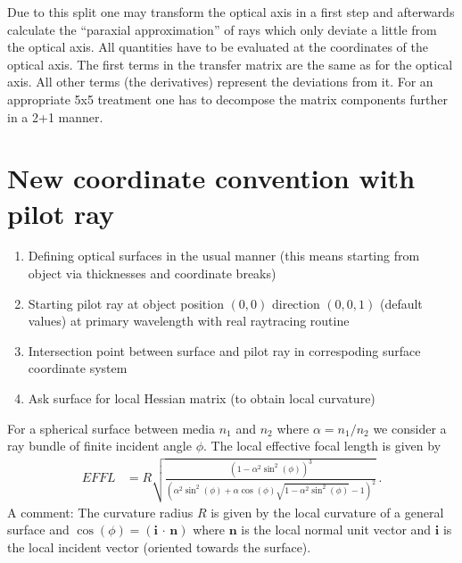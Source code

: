 \documentclass[12pt,a4paper,twoside,openright,BCOR10mm,headsepline,titlepage,abstracton,chapterprefix,final]{scrreprt}
\newcommand\Vector[1]{{\mathbf{#1}}}
\newcommand{\scpm}[2]{(#1\,\cdot\,#2)}
\begin{document}
Due to this split one may transform the optical axis in a first step and afterwards calculate the ``paraxial approximation'' of rays which
only deviate a little from the optical axis. All quantities have to be evaluated at the coordinates of the optical axis. The first terms
in the transfer matrix are the same as for the optical axis. All other terms (the derivatives) represent the deviations from it.
For an appropriate 5x5 treatment one has to decompose the matrix components further in a 2+1 manner.
\section{New coordinate convention with pilot ray}
\begin{enumerate}
 \item Defining optical surfaces in the usual manner (this means starting from object via thicknesses and coordinate breaks)
 \item Starting pilot ray at object position $(0, 0)$ direction $(0, 0, 1)$ (default values) at primary wavelength with real raytracing routine
 \item Intersection point between surface and pilot ray in correspoding surface coordinate system
 \item Ask surface for local Hessian matrix (to obtain local curvature)
\end{enumerate}
For a spherical surface between media $n_1$ and $n_2$ where $\alpha = n_1/n_2$ we consider a ray bundle
of finite incident angle $\phi$.
The local effective focal length is given by
\begin{align}
 EFFL &= R \sqrt{\frac{\left(1- \alpha ^2 \sin ^2(\phi )\right)^3}{\left(\alpha ^2 \sin ^2(\phi )+\alpha \cos (\phi ) \sqrt{1-\alpha ^2 \sin ^2(\phi )}-1\right)^2}}\,.
\end{align}
A comment: The curvature radius $R$ is given by the local curvature of a general surface and $\cos(\phi) = \scpm{\Vector{i}}{\Vector{n}}$
where $\Vector{n}$ is the local normal unit vector and $\Vector{i}$ is the local incident vector (oriented towards the surface).
\end{document}
